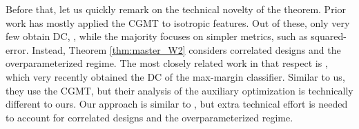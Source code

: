 Before that, let us quickly remark on the technical novelty of the theorem. Prior work has mostly applied the CGMT to isotropic features. Out of these, only very few obtain DC, \cite{thrampoulidis2018symbol,miolane2018distribution}, while the majority focuses on simpler metrics, such as squared-error. Instead, Theorem \ref{thm:master_W2} considers correlated designs and the overparameterized regime. The most closely related work in that respect is \cite{montanari2019generalization}, which very recently obtained the DC of the max-margin classifier. Similar to us, they use the CGMT, but their analysis of the auxiliary optimization is technically different to ours. Our approach is similar to \cite{thrampoulidis2018symbol}, but extra technical effort is needed to account for correlated designs and the overparameterized regime.

